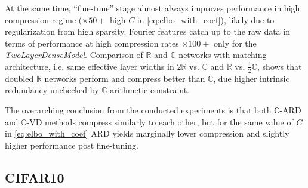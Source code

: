 \documentclass[a4paper,10pt,twocolumn]{article}
\newcommand{\real}{\mathbb{R}}
\newcommand{\cplx}{\mathbb{C}}
\begin{document}
At the same time, ``fine-tune'' stage almost always improves performance in high compression
regime ($\times50+$ high $C$ in \eqref{eq:elbo_with_coef}), likely due to regularization from
high sparsity.
Fourier features catch up to the raw data in terms of performance at high compression
rates $\times100+$ only for the \emph{TwoLayerDenseModel}.
%
Comparison of $\real$ and $\cplx$ networks with matching architecture, i.e. same effective
layer widths in $2\real$ vs. $\cplx$ and $\real$ vs. $\tfrac12\cplx$, shows that doubled
$\real$ networks perform and compress better than $\cplx$, due higher intrinsic redundancy
unchecked by $\cplx$-arithmetic constraint.

The overarching conclusion from the conducted experiments is that both $\cplx$-ARD and
$\cplx$-VD methods compress similarly to each other, but for the same value of $C$ in
\eqref{eq:elbo_with_coef} ARD yields marginally lower compression and slightly
higher performance post fine-tuning.
%



\subsection{CIFAR10} %
\label{sub:cifar10}
\end{document}
